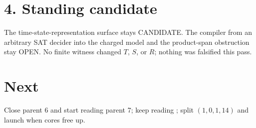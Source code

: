 \documentclass[11pt]{article}
\begin{document}
\section*{4. Standing candidate}
The time-state-representation surface stays CANDIDATE. The compiler from an arbitrary SAT decider into the charged model and the product-span obstruction stay OPEN. No finite witness changed $T$, $S$, or $R$; nothing was falsified this pass.

\section*{Next}
Close parent 6 and start reading parent 7; keep reading ; split $(1,0,1,14)$ and launch  when cores free up.
\end{document}
